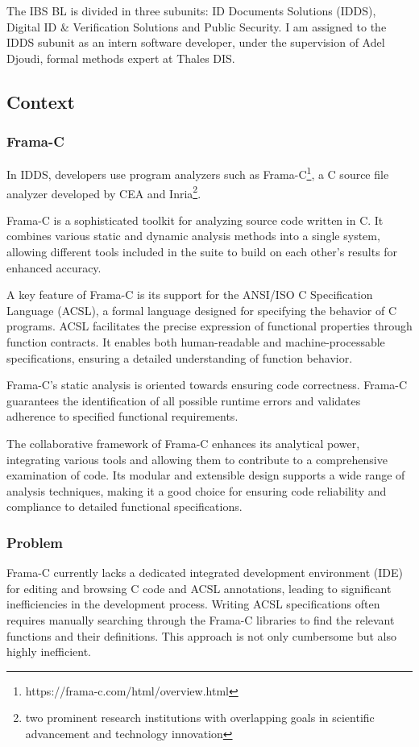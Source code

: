 \documentclass[10pt]{article}
\begin{document}
\begin{singlespace}
The IBS BL is divided in three subunits: ID Documents Solutions (IDDS), Digital ID \& Verification Solutions and Public Security. I am assigned to the IDDS subunit as an intern software developer, under the supervision of Adel Djoudi, formal methods expert at Thales DIS.\@

\subsection{Context}
\color{magenta}
\subsubsection{Frama-C}
In IDDS, developers use program analyzers such as Frama-C\footnote{https://frama-c.com/html/overview.html}, a C source file analyzer developed by CEA and Inria\footnote{two prominent research institutions with overlapping goals in scientific advancement and technology innovation}. 

Frama-C is a sophisticated toolkit for analyzing source code written in C. It combines various static and dynamic analysis methods into a single system, allowing different tools included in the suite to build on each other's results for enhanced accuracy.

A key feature of Frama-C is its support for the ANSI/ISO C Specification Language (ACSL), a formal language designed for specifying the behavior of C programs. ACSL facilitates the precise expression of functional properties through function contracts. It enables both human-readable and machine-processable specifications, ensuring a detailed understanding of function behavior.

Frama-C's static analysis is oriented towards ensuring code correctness. Frama-C guarantees the identification of all possible runtime errors and validates adherence to specified functional requirements.

The collaborative framework of Frama-C enhances its analytical power, integrating various tools and allowing them to contribute to a comprehensive examination of code. Its modular and extensible design supports a wide range of analysis techniques, making it a good choice for ensuring code reliability and compliance to detailed functional specifications.

\subsubsection{Problem}
Frama-C currently lacks a dedicated integrated development environment (IDE) for editing and browsing C code and ACSL annotations, leading to significant inefficiencies in the development process. Writing ACSL specifications often requires manually searching through the Frama-C libraries to find the relevant functions and their definitions. This approach is not only cumbersome but also highly inefficient.


\end{singlespace}
\end{document}

